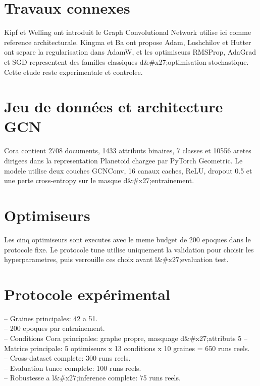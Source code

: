 \documentclass[11pt,a4paper]{article}
\begin{document}
\section{Travaux connexes}
\par
Kipf et Welling ont introduit le Graph Convolutional Network utilise ici comme reference architecturale. Kingma et Ba ont propose Adam, Loshchilov et Hutter ont separe la regularisation dans AdamW, et les optimiseurs RMSProp, AdaGrad et SGD representent des familles classiques d&#x27;optimisation stochastique. Cette etude reste experimentale et controlee.
\par
\section{Jeu de données et architecture GCN}
\par
Cora contient 2708 documents, 1433 attributs binaires, 7 classes et 10556 aretes dirigees dans la representation Planetoid chargee par PyTorch Geometric. Le modele utilise deux couches GCNConv, 16 canaux caches, ReLU, dropout 0.5 et une perte cross-entropy sur le masque d&#x27;entrainement.
\par
\section{Optimiseurs}
\par
Les cinq optimiseurs sont executes avec le meme budget de 200 epoques dans le protocole fixe. Le protocole tune utilise uniquement la validation pour choisir les hyperparametres, puis verrouille ces choix avant l&#x27;evaluation test.
\par
\section{Protocole expérimental}
\par
\noindent-- Graines principales: 42 a 51.\\
\noindent-- 200 epoques par entrainement.\\
\noindent-- Conditions Cora principales: graphe propre, masquage d&#x27;attributs 5%
\noindent-- Matrice principale: 5 optimiseurs x 13 conditions x 10 graines = 650 runs reels.\\
\noindent-- Cross-dataset complete: 300 runs reels.\\
\noindent-- Evaluation tunee complete: 100 runs reels.\\
\noindent-- Robustesse a l&#x27;inference complete: 75 runs reels.\\
\par
\end{document}
